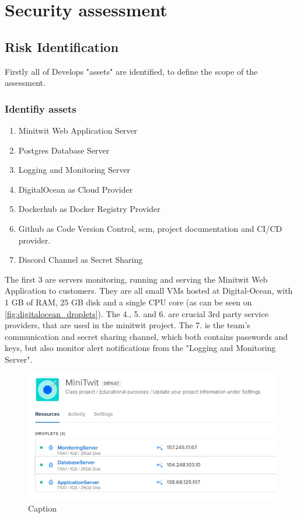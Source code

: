 \section{Security assessment}\label{app:security_ass}

\subsection{Risk Identification}

Firstly all of Develops "assets" are identified, to define the scope of the assessment. 
\subsubsection{Identifiy assets}
\begin{enumerate}
    \item Minitwit Web Application Server
    \item Postgres Database Server
    \item Logging and Monitoring Server
    \item DigitalOcean as Cloud Provider
    \item Dockerhub as Docker Registry Provider
    \item Github as Code Version Control, \acrshort{scm}, project documentation and CI/CD provider.
    \item Discord Channel as Secret Sharing
\end{enumerate}

The first 3 are servers monitoring, running and serving the Minitwit Web Application to customers. They are all small VMs hosted at Digital-Ocean, with 1 GB of RAM, 25 GB disk and a single CPU core (as can be seen on \autoref{fig:digitalocean_droplets}). 
The 4., 5. and 6. are crucial 3rd party service providers, that are used in the minitwit project.
The 7. is the team's communication and secret sharing channel, which both contains passwords and keys, but also monitor alert notifications from the "Logging and Monitoring Server".  


\begin{figure}[H]
    \centering
    \includegraphics[scale=.5]{images/digitalocean_droplets.jpg}
    \caption{Caption}
    \label{fig:digitalocean_droplets}
\end{figure}

